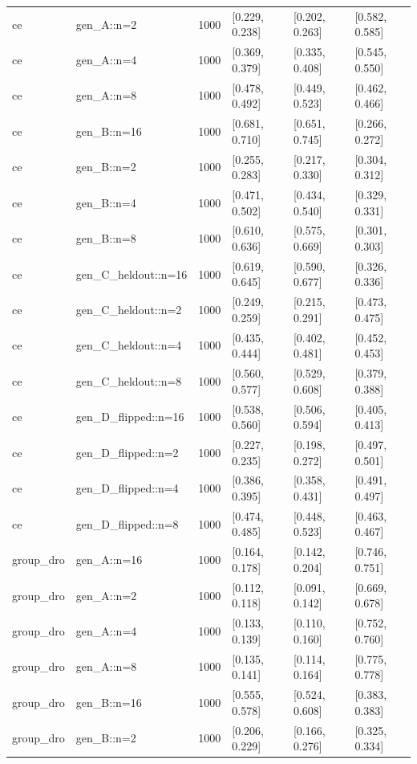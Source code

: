 \begin{tabular}{llrlll}
ce & gen\_A::n=2 & 1000 & [0.229, 0.238] & [0.202, 0.263] & [0.582, 0.585] \\
ce & gen\_A::n=4 & 1000 & [0.369, 0.379] & [0.335, 0.408] & [0.545, 0.550] \\
ce & gen\_A::n=8 & 1000 & [0.478, 0.492] & [0.449, 0.523] & [0.462, 0.466] \\
ce & gen\_B::n=16 & 1000 & [0.681, 0.710] & [0.651, 0.745] & [0.266, 0.272] \\
ce & gen\_B::n=2 & 1000 & [0.255, 0.283] & [0.217, 0.330] & [0.304, 0.312] \\
ce & gen\_B::n=4 & 1000 & [0.471, 0.502] & [0.434, 0.540] & [0.329, 0.331] \\
ce & gen\_B::n=8 & 1000 & [0.610, 0.636] & [0.575, 0.669] & [0.301, 0.303] \\
ce & gen\_C\_heldout::n=16 & 1000 & [0.619, 0.645] & [0.590, 0.677] & [0.326, 0.336] \\
ce & gen\_C\_heldout::n=2 & 1000 & [0.249, 0.259] & [0.215, 0.291] & [0.473, 0.475] \\
ce & gen\_C\_heldout::n=4 & 1000 & [0.435, 0.444] & [0.402, 0.481] & [0.452, 0.453] \\
ce & gen\_C\_heldout::n=8 & 1000 & [0.560, 0.577] & [0.529, 0.608] & [0.379, 0.388] \\
ce & gen\_D\_flipped::n=16 & 1000 & [0.538, 0.560] & [0.506, 0.594] & [0.405, 0.413] \\
ce & gen\_D\_flipped::n=2 & 1000 & [0.227, 0.235] & [0.198, 0.272] & [0.497, 0.501] \\
ce & gen\_D\_flipped::n=4 & 1000 & [0.386, 0.395] & [0.358, 0.431] & [0.491, 0.497] \\
ce & gen\_D\_flipped::n=8 & 1000 & [0.474, 0.485] & [0.448, 0.523] & [0.463, 0.467] \\
group\_dro & gen\_A::n=16 & 1000 & [0.164, 0.178] & [0.142, 0.204] & [0.746, 0.751] \\
group\_dro & gen\_A::n=2 & 1000 & [0.112, 0.118] & [0.091, 0.142] & [0.669, 0.678] \\
group\_dro & gen\_A::n=4 & 1000 & [0.133, 0.139] & [0.110, 0.160] & [0.752, 0.760] \\
group\_dro & gen\_A::n=8 & 1000 & [0.135, 0.141] & [0.114, 0.164] & [0.775, 0.778] \\
group\_dro & gen\_B::n=16 & 1000 & [0.555, 0.578] & [0.524, 0.608] & [0.383, 0.383] \\
group\_dro & gen\_B::n=2 & 1000 & [0.206, 0.229] & [0.166, 0.276] & [0.325, 0.334] \\

\end{tabular}
